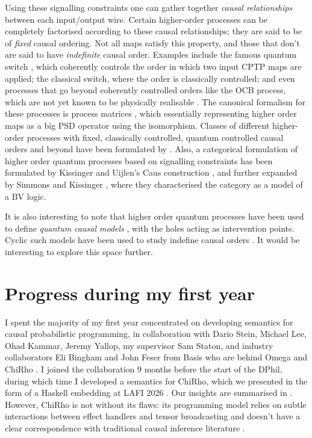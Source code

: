 \documentclass[11pt,a4paper]{article}
\begin{document}
Using these signalling constraints one can gather together \emph{causal relationships} between each input/output wire. Certain higher-order processes can be completely factorised according to these causal relationships; they are said to be of \emph{fixed} causal ordering. Not all maps satisfy this property, and those that don't are said to have \emph{indefinite} causal order. Examples include the famous quantum switch , which coherently controls the order in which two input CPTP maps are applied; the classical switch, where the order is classically controlled; and even processes that go beyond coherently controlled orders like the OCB process, which are not yet known to be physically realisable . The canonical formalism for these processes is process matrices , which essentially representing higher order maps as a big PSD operator using the  isomorphism. Classes of different higher-order processes with fixed, classically controlled, quantum controlled causal orders and beyond have been formulated by . Also, a categorical formulation of higher order quantum processes based on signalling constraints has been formulated by Kissinger and Uijlen's Caus construction , and further expanded by Simmons and Kissinger , where they characterised the category as a model of a BV logic. 

It is also interesting to note that higher order quantum processes have been used to define \emph{quantum causal models} , with the holes acting as intervention points. Cyclic such models have been used to study indefine causal orders . It would be interesting to explore this space further.

\section{Progress during my first year}\label{sec:firstyear}
I spent the majority of my first year concentrated on developing semantics for causal probabilistic programming, in collaboration with Dario Stein, Michael Lee, Ohad Kammar, Jeremy Yallop, my supervisor Sam Staton, and industry collaborators Eli Bingham and John Feser from Basis who are behind Omega \cite{tavares2021language} and ChiRho \cite{chirho}. I joined the collaboration 9 months before the start of the DPhil, during which time I developed a semantics for ChiRho, which we presented in the form of a Haskell embedding at LAFI 2026 \cite{lafi-wang}. Our insights are summarised in . However, ChiRho is not without its flaws: its programming model relies on subtle interactions between effect handlers and tensor broadcasting and doesn't have a clear correspondence with traditional causal inference literature \cite{lafi-wang,wang2026causalppl}. 
\end{document}
